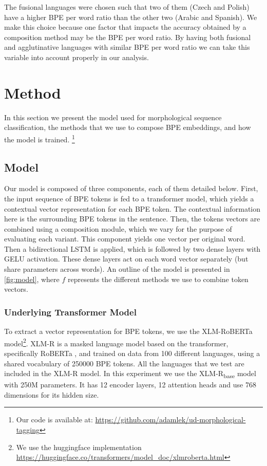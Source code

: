 \documentclass[11pt]{article}
\newcommand\citep{\cite}
\begin{document}
            The fusional languages were chosen such that two of them
     (Czech and Polish) have a higher BPE per word ratio than the
     other two (Arabic and Spanish). We make this choice because one
     factor that impacts the accuracy obtained by a composition method
     may be the BPE per word ratio.  By having both fusional and
     agglutinative languages with similar BPE per word ratio we can
     take this variable into account properly in our analysis.
        
	\section{Method}
	\label{method}
        	In this section we present the model used for
     morphological sequence classification, the methods that we use to
     compose BPE embeddings, and how the model is
     trained. \footnote{Our code is available at:
     \url{https://github.com/adamlek/ud-morphological-tagging}}

	\subsection{Model}

            Our model is composed of three components, each of them
     detailed below. First, the input sequence of BPE tokens is fed to
     a transformer model, which yields a contextual vector
     representation for each BPE token. The contextual information
     here is the surrounding BPE tokens in the sentence.  Then, the
     tokens vectors are combined using a composition module, which we
     vary for the purpose of evaluating each variant. This component
     yields one vector per original word. Then a bidirectional LSTM is
     applied, which is followed by two dense layers with GELU
     \citep{hendrycks2016gaussian} activation. These dense layers act
     on each word vector separately (but share parameters across
     words).  An outline of the model is presented in
     \cref{fig:model}, where $f$ represents the different methods we
     use to combine token vectors.

	\subsubsection{Underlying Transformer Model}
         To extract a vector representation for BPE tokens, we use the
     XLM-RoBERTa \cite{conneau2019unsupervised} model\footnote{We use
     the huggingface implementation
     \url{https://huggingface.co/transformers/model_doc/xlmroberta.html}}. XLM-R
     is a masked language model based on the transformer, specifically
     RoBERTa \citep{liu2019roberta}, and trained on data from 100
     different languages, using a shared vocabulary of 250000 BPE
     tokens. All the languages that we test are included in the XLM-R
     model. In this experiment we use the XLM-R\textsubscript{base} model
     with 250M parameters. It has 12 encoder layers, 12 attention
     heads and use 768 dimensions for its hidden size.
\end{document}

